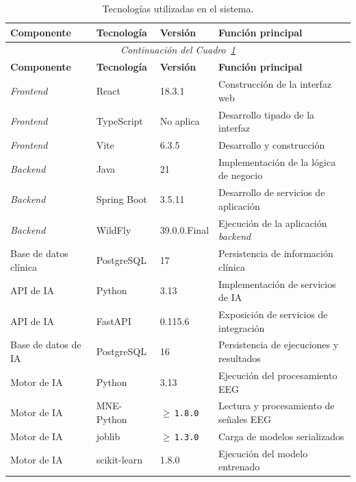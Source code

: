 \begin{longtable}{|
p{0.18\dimexpr\textwidth-8\tabcolsep-5\arrayrulewidth\relax}|
p{0.19\dimexpr\textwidth-8\tabcolsep-5\arrayrulewidth\relax}|
p{0.18\dimexpr\textwidth-8\tabcolsep-5\arrayrulewidth\relax}|
p{0.45\dimexpr\textwidth-8\tabcolsep-5\arrayrulewidth\relax}|}

\caption[Principales tecnologías utilizadas en el sistema]%
{Tecnologías utilizadas en el sistema.}
\label{tab:tecnologias}\\
\hline
\textbf{Componente} &
\textbf{Tecnología} &
\textbf{Versión} &
\textbf{Función principal} \\
\hline
\endfirsthead

\multicolumn{4}{c}{\textit{Continuación del Cuadro~\ref{tab:tecnologias}}}\\
\hline
\textbf{Componente} &
\textbf{Tecnología} &
\textbf{Versión} &
\textbf{Función principal} \\
\hline
\endhead

\textit{Frontend} & React & 18.3.1 &
Construcción de la interfaz web \\
\hline
\textit{Frontend} & TypeScript & No aplica &
Desarrollo tipado de la interfaz \\
\hline
\textit{Frontend} & Vite & 6.3.5 &
Desarrollo y construcción \\
\hline
\textit{Backend} & Java & 21 &
Implementación de la lógica de negocio \\
\hline
\textit{Backend} & Spring Boot & 3.5.11 &
Desarrollo de servicios de aplicación \\
\hline
\textit{Backend} & WildFly & 39.0.0.Final &
Ejecución de la aplicación \textit{backend} \\
\hline
Base de datos clínica & PostgreSQL & 17 &
Persistencia de información clínica \\
\hline
API de IA & Python & 3.13 &
Implementación de servicios de IA \\
\hline
API de IA & FastAPI & 0.115.6 &
Exposición de servicios de integración \\
\hline
Base de datos de IA & PostgreSQL & 16 &
Persistencia de ejecuciones y resultados \\
\hline
Motor de IA & Python & 3.13 &
Ejecución del procesamiento EEG \\
\hline
Motor de IA & MNE-Python & $\geq$\,\texttt{1.8.0} &
Lectura y procesamiento de señales EEG \\
\hline
Motor de IA & joblib & $\geq$\,\texttt{1.3.0} &
Carga de modelos serializados \\
\hline
Motor de IA & scikit-learn & 1.8.0 &
Ejecución del modelo entrenado \\
\hline

\end{longtable}
\endgroup

